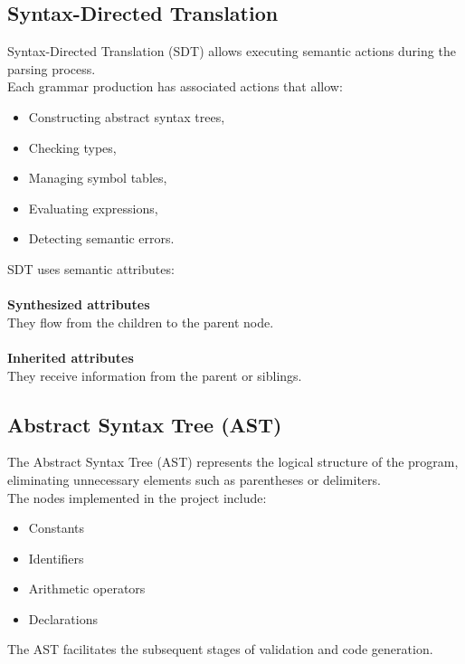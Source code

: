 \documentclass[letterpaper,12pt,oneside]{article}
\begin{document}
    \subsection{Syntax-Directed Translation}
    Syntax-Directed Translation (SDT) allows executing semantic actions during the parsing process. \\
    Each grammar production has associated actions that allow:
    \begin{itemize}
        \item Constructing abstract syntax trees,
        \item Checking types,
        \item Managing symbol tables,
        \item Evaluating expressions,
        \item Detecting semantic errors.
    \end{itemize}
    SDT uses semantic attributes: \\ \\
    \textbf{Synthesized attributes} \\
    They flow from the children to the parent node. \\ \\
    \textbf{Inherited attributes} \\
    They receive information from the parent or siblings. 

    \subsection{Abstract Syntax Tree (AST)}
    The Abstract Syntax Tree (AST) represents the logical structure of the program, eliminating unnecessary elements such as parentheses or delimiters.\cite{gfg_sdt_2025} \\ 
    The nodes implemented in the project include:
    \begin{itemize}
        \item Constants 
        \item Identifiers
        \item Arithmetic operators
        \item Declarations
    \end{itemize}
    The AST facilitates the subsequent stages of validation and code generation.
\end{document}
